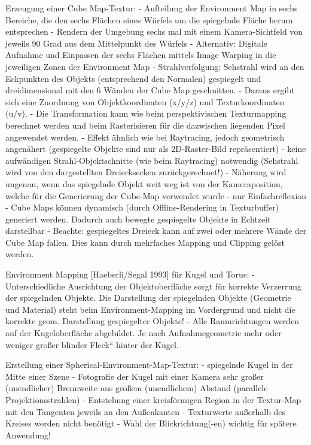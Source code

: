 \documentclass[10pt,landscape]{article}
\begin{document}
\begin{multicols}{3}
  Erzeugung einer Cube Map-Textur:
  - Aufteilung der Environment Map in sechs Bereiche, die den sechs Flächen eines Würfels um die spiegelnde Fläche herum entsprechen
  - Rendern der Umgebung sechs mal mit einem Kamera-Sichtfeld von jeweils 90 Grad aus dem Mittelpunkt des Würfels
  - Alternativ: Digitale Aufnahme und Einpassen der sechs Flächen mittels Image Warping in die jeweiligen Zonen der Environment Map
  - Strahlverfolgung: Sehstrahl wird an den Eckpunkten des Objekts (entsprechend den Normalen) gespiegelt und dreidimensional mit den 6 Wänden der Cube Map geschnitten.
  - Daraus ergibt sich eine Zuordnung von Objektkoordinaten (x/y/z) und Texturkoordinaten (u/v). 
  - Die Transformation kann wie beim perspektivischen Texturmapping berechnet werden und beim Rasterisieren für die dazwischen liegenden Pixel angewendet werden.
  - Effekt ähnlich wie bei Raytracing, jedoch geometrisch angenähert (gespiegelte Objekte sind nur als 2D-Raster-Bild repräsentiert)
  - keine aufwändigen Strahl-Objektschnitte (wie beim Raytracing) notwendig (Sehstrahl wird von den dargestellten Dreiecksecken zurückgerechnet!)
  - Näherung wird ungenau, wenn das spiegelnde Objekt weit weg ist von der Kameraposition, welche für die Generierung der Cube-Map verwendet wurde
  - nur Einfachreflexion
  - Cube Maps können dynamisch (durch Offline-Rendering in Texturbuffer) generiert werden. Dadurch auch bewegte gespiegelte Objekte in Echtzeit darstellbar
  - Beachte: gespiegeltes Dreieck kann auf zwei oder mehrere Wände der Cube Map fallen. Dies kann durch mehrfaches Mapping und Clipping gelöst werden.
  
  Environment Mapping [Haeberli/Segal 1993] für Kugel und Torus: 
  - Unterschiedliche Ausrichtung der Objektoberfläche sorgt für korrekte Verzerrung der spiegelnden Objekte. Die Darstellung der spiegelnden Objekte (Geometrie und Material) steht beim Environment-Mapping im Vordergrund und nicht die korrekte geom. Darstellung gespiegelter Objekte!
  - Alle Raumrichtungen werden auf der Kugeloberfläche abgebildet. Je nach Aufnahmegeometrie mehr oder weniger großer blinder Fleck“ hinter der Kugel.
  
  
  Erstellung einer Spherical-Environment-Map-Textur:
  - spiegelnde Kugel in der Mitte einer Szene
  - Fotografie der Kugel mit einer Kamera sehr großer (unendlicher) Brennweite aus großem (unendlichem) Abstand (parallele Projektionsstrahlen)
  - Entstehung einer kreisförmigen Region in der Textur-Map mit den Tangenten jeweils an den Außenkanten
  - Texturwerte außerhalb des Kreises werden nicht benötigt
  - Wahl der Blickrichtung(-en) wichtig für spätere Anwendung!
  

\end{multicols}
\end{document}
